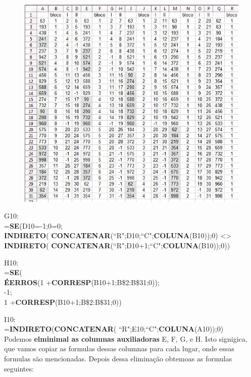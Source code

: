 \documentclass[12pt]{article}
\begin{document}
\begin{figure}[htb]
\begin{center}
\includegraphics{./imgs/pic6}
\end{center}
\caption{}\label{pic6}
\end{figure}

G10:\\
=\textbf{SE}(D10=-1;0=0;\\
 \textbf{INDIRETO}(
\textbf{CONCATENAR}(``R";D10;``C";\textbf{COLUNA}(B10));0)
\textless\textgreater\\
 \textbf{INDIRETO}(
\textbf{CONCATENAR}(``R";D10+1;``C";\textbf{COLUNA}(B10));0))

H10:\\
=\textbf{SE}(\\
\textbf{\'EERROS}(1
+\textbf{CORRESP}(B10+1;B\$2:B\$31;0));\\
-1;\\
1 +\textbf{CORRESP}(B10+1;B\$2:B\$31;0))

I10:\\
=\textbf{INDIRETO}(\textbf{CONCATENAR}(
``R";E10;``C";\textbf{COLUNA}(A10));0)\\

Podemos \textbf{elminimal as columnas auxiliadoras} E, F, G, e H.
Isto signigica, que vamos copiar as formulas dessas columnas para
cada lugar, onde essas formulas s\~ao mencionadas. Depois dessa
elimina\c{c}\~ao obtemoas as formulas seguintes:
\end{document}

